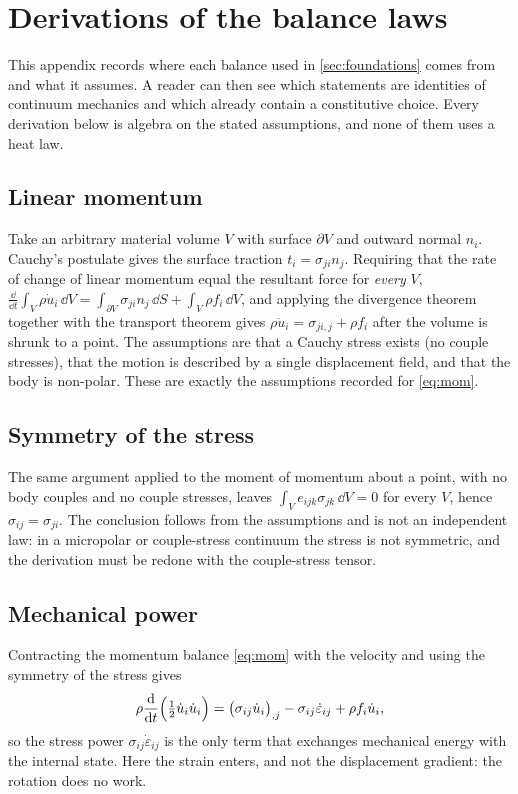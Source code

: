 \section{Derivations of the balance laws}\label{app:balance}

This appendix records where each balance used in \cref{sec:foundations} comes from and what it assumes. A reader can then see which statements are identities of continuum mechanics and which already contain a constitutive choice. Every derivation below is algebra on the stated assumptions, and none of them uses a heat law.

\subsection*{Linear momentum}
Take an arbitrary material volume $V$ with surface $\partial V$ and outward normal $n_i$. Cauchy's
postulate gives the surface traction $t_i=\sigma_{ji}n_j$. Requiring that the rate of change of linear momentum
equal the resultant force for \emph{every} $V$,
$\frac{\dd}{\dd t}\int_V\rho\dot u_i\,\dd V=\int_{\partial V}\sigma_{ji}n_j\,\dd S+\int_V\rho f_i\,\dd V$,
and applying the divergence theorem together with the transport theorem gives
$\rho\ddot u_i=\sigma_{ji,j}+\rho f_i$ after the volume is shrunk to a point. The assumptions are that a Cauchy
stress exists (no couple stresses), that the motion is described by a single displacement field, and that the body is
non-polar. These are exactly the assumptions recorded for \eqref{eq:mom}.

\subsection*{Symmetry of the stress}
The same argument applied to the moment of momentum about a point, with no body couples and no couple
stresses, leaves $\int_V e_{ijk}\sigma_{jk}\,\dd V=0$ for every $V$, hence $\sigma_{ij}=\sigma_{ji}$. The
conclusion follows from the assumptions and is not an independent law: in a micropolar or couple-stress
continuum the stress is not symmetric, and the derivation must be redone with the couple-stress tensor.

\subsection*{Mechanical power}
Contracting the momentum balance \eqref{eq:mom} with the velocity and using the symmetry of the stress gives
\begin{equation}
\rho\frac{\mathrm d}{\mathrm d t}\Bigl(\tfrac12\dot u_i\dot u_i\Bigr)=\bigl(\sigma_{ij}\dot u_i\bigr)_{,j}
-\sigma_{ij}\dot\varepsilon_{ij}+\rho f_i\dot u_i ,
\end{equation}
so the stress power $\sigma_{ij}\dot\varepsilon_{ij}$ is the only term that exchanges mechanical energy with
the internal state. Here the strain enters, and not the displacement gradient: the rotation does no work.

